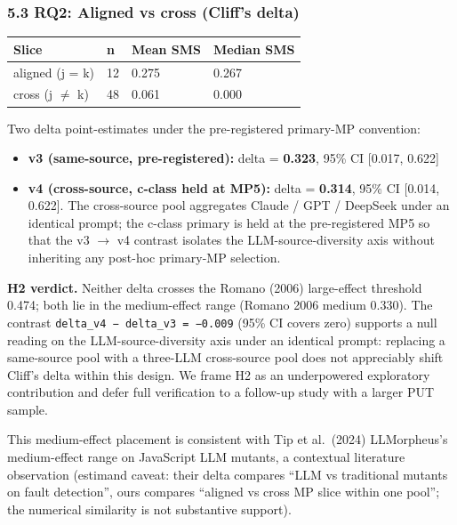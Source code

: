 \documentclass[review,12pt,authoryear]{elsarticle}
\providecommand{\tightlist}{\setlength{\itemsep}{0pt}\setlength{\parskip}{0pt}}
\newcounter{none}                   %
\begin{document}
\subsubsection{5.3 RQ2: Aligned vs cross (Cliff's
delta)}\label{rq2-aligned-vs-cross-cliffs-delta}

{\def\LTcaptype{none} %
\begin{longtable}[]{@{}llll@{}}
\toprule\noalign{}
Slice & n & Mean SMS & Median SMS \\
\midrule\noalign{}
\endhead
\bottomrule\noalign{}
\endlastfoot
aligned (j = k) & 12 & 0.275 & 0.267 \\
cross (j $\neq$ k) & 48 & 0.061 & 0.000 \\
\end{longtable}
}

Two delta point-estimates under the pre-registered primary-MP
convention:

\begin{itemize}
\tightlist
\item
  \textbf{v3 (same-source, pre-registered):} delta = \textbf{0.323},
  95\% CI {[}0.017, 0.622{]}
\item
  \textbf{v4 (cross-source, c-class held at MP5):} delta =
  \textbf{0.314}, 95\% CI {[}0.014, 0.622{]}. The cross-source pool
  aggregates Claude / GPT / DeepSeek under an identical prompt; the
  c-class primary is held at the pre-registered MP5 so that the v3 $\to$ v4
  contrast isolates the LLM-source-diversity axis without inheriting any
  post-hoc primary-MP selection.
\end{itemize}

\textbf{H2 verdict.} Neither delta crosses the Romano (2006)
large-effect threshold 0.474; both lie in the medium-effect range
(Romano 2006 medium 0.330). The contrast
\texttt{delta\_v4\ −\ delta\_v3\ =\ −0.009} (95\% CI covers zero)
supports a null reading on the LLM-source-diversity axis under an
identical prompt: replacing a same-source pool with a three-LLM
cross-source pool does not appreciably shift Cliff's delta within this
design. We frame H2 as an underpowered exploratory contribution and
defer full verification to a follow-up study with a larger PUT sample.

This medium-effect placement is consistent with Tip et al.~(2024)
LLMorpheus's medium-effect range on JavaScript LLM mutants, a contextual
literature observation (estimand caveat: their delta compares ``LLM vs
traditional mutants on fault detection'', ours compares ``aligned vs
cross MP slice within one pool''; the numerical similarity is not
substantive support).
\end{document}
